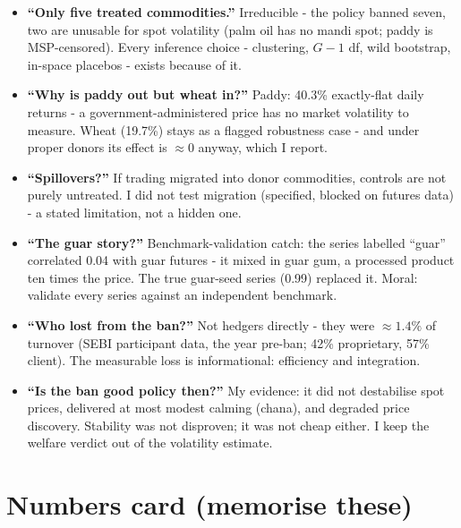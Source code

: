 \documentclass[11pt]{article}
\begin{document}
\begin{itemize}[leftmargin=1.6em,itemsep=2pt]
  \item \textbf{``Only five treated commodities.''} Irreducible - the policy banned seven,
        two are unusable for spot volatility (palm oil has no mandi spot; paddy is
        MSP-censored). Every inference choice - clustering, $G{-}1$ df, wild bootstrap,
        in-space placebos - exists because of it.
  \item \textbf{``Why is paddy out but wheat in?''} Paddy: 40.3\% exactly-flat daily
        returns - a government-administered price has no market volatility to measure.
        Wheat (19.7\%) stays as a flagged robustness case - and under proper donors its
        effect is $\approx0$ anyway, which I report.
  \item \textbf{``Spillovers?''} If trading migrated into donor commodities, controls are
        not purely untreated. I did not test migration (specified, blocked on futures
        data) - a stated limitation, not a hidden one.
  \item \textbf{``The guar story?''} Benchmark-validation catch: the series labelled
        ``guar'' correlated 0.04 with guar futures - it mixed in guar gum, a processed
        product ten times the price. The true guar-seed series (0.99) replaced it. Moral:
        validate every series against an independent benchmark.
  \item \textbf{``Who lost from the ban?''} Not hedgers directly - they were $\approx1.4\%$
        of turnover (SEBI participant data, the year pre-ban; 42\% proprietary, 57\%
        client). The measurable loss is informational: efficiency and integration.
  \item \textbf{``Is the ban good policy then?''} My evidence: it did not destabilise spot
        prices, delivered at most modest calming (chana), and degraded price discovery.
        Stability was not disproven; it was not cheap either. I keep the welfare verdict
        out of the volatility estimate.
\end{itemize}

\section{Numbers card (memorise these)}
\end{document}
